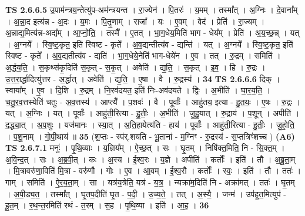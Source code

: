 \documentclass[17pt]{extarticle}
\begin{document}
                  \newline
                                \textbf{ TS 2.6.6.5} \newline
                  उ॒पाम॑न्त्रय॒न्तेत्यु॑प-अम॑न्त्रयन्त । रा॒ज्येन॑ । पि॒तरः॑ । य॒मम् । तस्मा᳚त् । अ॒ग्निः । दे॒वाना᳚म् । अ॒न्ना॒द इत्य॑न्न - अ॒दः । य॒मः । पि॒तृ॒णाम् । राजा᳚ । यः । ए॒वम् । वेद॑ । प्रेति॑ । रा॒ज्यम् । अ॒न्नाद्य॒मित्य॑न्न-अद्य᳚म् । आ॒प्नो॒ति॒ । तस्मै᳚ । ए॒तत् । भा॒ग॒धेय॒मिति॑ भाग - धेय᳚म् । प्रेति॑ । अ॒य॒च्छ॒न्न् । यत् । अ॒ग्नये᳚ । स्वि॒ष्ट॒कृत॒ इति॑ स्विष्ट - कृते᳚ । अ॒व॒द्यन्तीत्य॑व - द्यन्ति॑ । यत् । अ॒ग्नये᳚ । स्वि॒ष्ट॒कृत॒ इति॑ स्विष्ट - कृते᳚ । अ॒व॒द्यतीत्य॑व - द्यति॑ । भा॒ग॒धेये॒नेति॑ भाग-धेये॑न । ए॒व । तत् । रु॒द्रम् । समिति॑ । अ॒र्द्ध॒य॒ति॒ । स॒कृथ्स॑कृ॒दिति॑ स॒कृत् - स॒कृ॒त् । अवेति॑ । द्य॒ति॒ । स॒कृत् । इ॒व॒ । हि । रु॒द्रः । उ॒त्त॒रा॒र्द्धादित्यु॑त्तर - अ॒र्द्धात् । अवेति॑ । द्य॒ति॒ । ए॒षा । वै । रु॒द्रस्य॑ । \textbf{  34} \newline
                  \newline
                                \textbf{ TS 2.6.6.6} \newline
                  दिक् । स्वाया᳚म् । ए॒व । दि॒शि । रु॒द्रम् । नि॒रव॑दयत॒ इति॑ निः-अव॑दयते । द्विः । अ॒भीति॑ । घा॒र॒य॒ति॒ । च॒तु॒र॒व॒त्तस्येति॑ चतुः - अ॒व॒त्तस्य॑ । आप्त्यै᳚ । प॒शवः॑ । वै । पूर्वाः᳚ । आहु॑तय॒ इत्या - हु॒त॒यः॒ । ए॒षः । रु॒द्रः । यत् । अ॒ग्निः । यत् । पूर्वाः᳚ । आहु॑ती॒रित्या - हु॒तीः॒ । अ॒भीति॑ । जु॒हु॒यात् । रु॒द्राय॑ । प॒शून् । अपीति॑ । द॒द्ध्या॒त् । अ॒प॒शुः । यज॑मानः । स्या॒त् । अ॒ति॒हायेत्य॑ति - हाय॑ । पूर्वाः᳚ । आहु॑ती॒रित्या - हु॒तीः॒ । जु॒हो॒ति॒ । प॒शू॒नाम् । गो॒पी॒थाय॑ ॥ \textbf{  35} \newline
                  \newline
                      (श॒प्तः - स्प॑र्.शयति - भू॒ताना॑ - म॒ग्निꣳ - रु॒द्रस्य॑ - स॒प्तत्रिꣳ॑शच्च )  \textbf{(A6)} \newline \newline
                                \textbf{ TS 2.6.7.1} \newline
                  मनुः॑ । पृ॒थि॒व्याः । य॒ज्ञिय᳚म् । ऐ॒च्छ॒त् । सः । घृ॒तम् । निषि॑क्त॒मिति॒ नि - सि॒क्त॒म् । अ॒वि॒न्द॒त् । सः । अ॒ब्र॒वी॒त् । कः । अ॒स्य । ई॒श्व॒रः । य॒ज्ञे । अपीति॑ । कर्तोः᳚ । इति॑ । तौ । अ॒ब्रू॒ता॒म् । मि॒त्रावरु॑णा॒विति॑ मि॒त्रा - वरु॑णौ । गोः । ए॒व । आ॒वम् । ई॒श्व॒रौ । कर्तोः᳚ । स्वः॒ । इति॑ । तौ । ततः॑ । गाम् । समिति॑ । ऐ॒र॒य॒ता॒म् । सा । यत्र॑य॒त्रेति॒ यत्र॑ - य॒त्र॒ । न्यक्रा॑म॒दिति॑ नि - अक्रा॑मत् । ततः॑ । घृ॒तम् । अ॒पी॒ड्य॒त॒ । तस्मा᳚त् । घृ॒तप॒दीति॑ घृ॒त - प॒दी॒ । उ॒च्य॒ते॒ । तत् । अ॒स्यै॒ । जन्म॑ । उप॑हूत॒मित्युप॑ - हू॒त॒म् । र॒थ॒न्त॒रमिति॑ रथं - त॒रम् । स॒ह । पृ॒थि॒व्या । इति॑ । आ॒ह॒ । \textbf{  36} \newline
\end{document}
